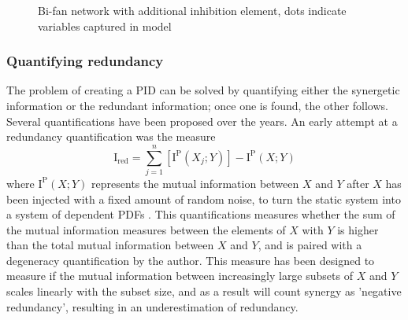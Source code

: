 \documentclass[../main.tex]{subfiles}
\begin{document}
\begin{figure}[ht]
\begin{center}
\end{center}
\caption{Bi-fan network with additional inhibition element, dots indicate variables captured in model}
\label{bifan_syn}
\end{figure}

\subsubsection{Quantifying redundancy}

The problem of creating a PID can be solved by quantifying either the synergetic information or the redundant information; once one is found, the other follows.
Several quantifications have been proposed over the years.
An early attempt at a redundancy quantification was the measure
%
\begin{equation}
\mathrm{I}_\mathrm{red} = \sum_{j=1}^n [\mathrm{I}^\mathrm{P}(X_j;Y)] - \mathrm{I}^\mathrm{P}(X;Y)
\end{equation}
%
where $\mathrm{I}^\mathrm{P}(X;Y)$ represents the mutual information between $X$ and $Y$ after $X$ has been injected with a fixed amount of random noise, to turn the static system into a system of dependent PDFs \cite{tononi1999measures}.
This quantifications measures whether the sum of the mutual information measures between the elements of $X$ with $Y$ is higher than the total mutual information between $X$ and $Y$, and is paired with a degeneracy quantification by the author.
This measure has been designed to measure if the mutual information between increasingly large subsets of $X$ and $Y$ scales linearly with the subset size, and as a result will count synergy as 'negative redundancy', resulting in an underestimation of redundancy.
\end{document}
